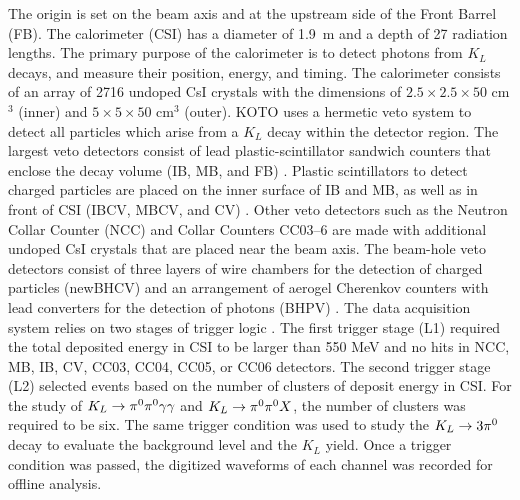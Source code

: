 \documentclass[twocolumn, superscriptaddress, aps,prl]{revtex4-2}
\begin{document}
The origin is set on the beam axis and at the upstream side of the Front Barrel (FB). The calorimeter (CSI) \cite{csi_calorimeter} has a diameter of \SI{1.9}{\meter} and a depth of 27 radiation lengths. The primary purpose of the calorimeter is to detect photons from $K_L$ decays, and measure  their position, energy, and timing. The calorimeter consists of an array of 2716 undoped CsI crystals with the dimensions of $2.5\times2.5\times50$ cm$^3$ (inner) and $5\times5\times50$ cm$^3$ (outer). KOTO uses a hermetic veto system to detect all particles which arise from a $K_L$ decay within the detector region. The largest veto detectors consist of lead plastic-scintillator sandwich counters that enclose the decay volume (IB, MB, and FB) \cite{barrel_veto, barrel_vetoes}. Plastic scintillators to detect charged particles are placed on the inner surface of IB and MB, as well as in front of CSI (IBCV, MBCV, and CV) \cite{cv}. Other veto detectors such as the Neutron Collar Counter (NCC) and Collar Counters CC03--6 are made with additional undoped CsI crystals that are placed near the beam axis. The beam-hole veto detectors consist of three layers of wire chambers for the detection of charged particles (newBHCV) and an arrangement of aerogel Cherenkov counters with lead converters for the detection of photons (BHPV) \cite{bhpv_maeda}. The data acquisition system relies on two stages of trigger logic \cite{cluster_finding_trigger}. The first trigger stage (L1) required the total deposited energy in CSI to be larger than 550 MeV and no hits in NCC, MB, IB, CV, CC03, CC04, CC05, or CC06 detectors. The second trigger stage (L2) selected events based on the number of clusters of deposit energy in CSI. For the study of $K_L \rightarrow \pi^0 \pi^0 \gamma \gamma$ and $K_L \rightarrow \pi^0 \pi^0 X$, the number of clusters was required to be six. The same trigger condition was used to study the $K_L \rightarrow 3\pi^0$ decay to evaluate the background level and the $K_L$ yield. Once a trigger condition was passed, the digitized waveforms of each channel was recorded for offline analysis.
\end{document}

